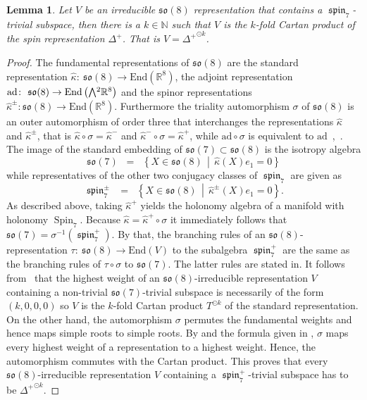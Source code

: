 \documentclass[11pt,a4paper]{article}
\theoremstyle{plain}
\newtheorem{lemma}{Lemma}
\theoremstyle{remark}
\newcommand{\parens}[1]{\ensuremath{\left(#1\right)}}
\newcommand{\set}[1]{\ensuremath{\left\{#1\right\}}}
\newcommand{\suchthat}{\,\middle|\,}
\newcommand{\I}[1]{\ensuremath{\mathbb{#1}}}
\newcommand{\Exterior}{\mathchoice{{\textstyle\bigwedge}}%
    {{\bigwedge}}%
    {{\textstyle\wedge}}%
    {{\scriptstyle\wedge}}}
\DeclareMathOperator{\Spin}{Spin}
\DeclareMathOperator{\spin}{\mathfrak{spin}}
\newcommand{\so}{\mathfrak{so}}
\newcommand{\ad}{\mathrm{ad}}
\newcommand{\End}{\mathrm{End}}
\begin{document}
\bigskip
\begin{lemma} \label{lem:sasaki:spin7_trivial}
  Let $V$ be an irreducible $\so(8)$ representation that contains a
  $\spin_7$-trivial subspace, then there is a $k \in \I{N}$ such that $V$ is
  the $k$-fold Cartan product of the spin representation $\Delta^+$. That is
  $V = {\Delta^+}^{\odot k}$.
\end{lemma}
\begin{proof}
  The fundamental representations of $\so(8)$ are the standard representation
  $\hat\kappa \colon\ \so(8) \to \End(\I{R}^8)$, the adjoint representation
  $\ad \colon\ \so(8) \to \End \parens{\Exterior^2 \I{R}^8}$ and the spinor
  representations $\hat\kappa^{\pm} \colon \so(8) \to \End(\I{R}^8)$.
  Furthermore the triality automorphism $\sigma$  of $\so(8)$ is an outer automorphism
  of order three that interchanges the representations $\hat\kappa$ and
  $\hat\kappa^\pm$, that is $\hat\kappa \circ \sigma = \hat\kappa^-$ and $\hat\kappa^- \circ \sigma =
  \hat\kappa^+$, while $\ad \circ \sigma$ is equivalent to $\ad$~\cite[Chapter 1 §8]{LM},~\cite[§20.3]{FH}.
  The image of the standard embedding of $\so(7) \subset \so(8)$ is the
  isotropy algebra
  \begin{equation}
    \so(7)\;\;=\;\;\set{X \in \so(8) \suchthat \hat\kappa(X) e_1 = 0}
  \end{equation}
  while representatives of the other two conjugacy classes of $\spin_7$ are
  given as
  \begin{equation}
    \spin^\pm_7
   \;\;=\;\;\set{X \in \so(8) \suchthat \hat\kappa^{\pm}(X) e_1 = 0}.
  \end{equation}
  As described above, taking $\hat\kappa^+$ yields the holonomy algebra of a manifold
  with holonomy $\Spin_7$.
  Because $\hat\kappa = \hat\kappa^+ \circ \sigma$ it immediately follows that $\so(7) =
  \sigma^{-1}(\spin^+_7)$. By that, the branching rules of an $\so(8)$-representation 
$\tau \colon\ \so(8) \to \End(V)$ to the subalgebra
  $\spin^+_7$ are the same as the branching rules of $\tau \circ \sigma$ to
  $\so(7)$.  The latter rules are stated in. 
  It follows from~\cite[(25.34),(25.35)]{FH} that the highest weight
  of an $\so(8)$-irreducible representation $V$ containing a non-trivial
  $\so(7)$-trivial subspace is necessarily of the form $(k,0,0,0)$ so $V$ is the
  $k$-fold Cartan product $T^{\odot k}$ of the standard representation.
  On the other hand, the automorphism $\sigma$ permutes the fundamental weights
  and hence maps simple roots to simple roots. By \cite[Theorem~5.5
  (a)]{Kn} and the formula given in \cite[Theorem~5.5 (d)]{Kn},
  $\sigma$ maps every highest weight of a representation to a highest weight.
  Hence, the automorphism commutes with the Cartan product.
  This proves that every $\so(8)$-irreducible representation $V$ containing
  a $\spin^+_7$-trivial subspace has to be ${\Delta^+}^{\odot k}$.
\end{proof}
\end{document}
